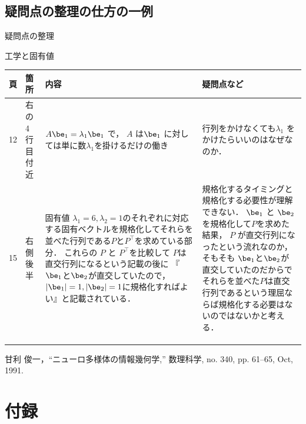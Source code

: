\documentclass[a4paper,11pt,dvipdfmx]{jarticle}  %
\begin{document}
%
%
%
%

\newpage


\subsection{疑問点の整理の仕方の一例}
\centerline{\Large\gt 疑問点の整理}
\vspace{2mm}
\noindent
工学と固有値\\
\begin{center}
\begin{tabular}{|c|p{}|p{}|p{}|} \hline
頁 & 箇所 & 内容 & 疑問点など \\ \hline
12 & 
右の4行目付近
& 
$ A \be_1 = \lambda_1 \be_1 $ で，
$A$ は$\be_1$ に対しては単に数$\lambda_1$を掛けるだけの働き
&
行列をかけなくても$\lambda_1$
をかけたらいいのはなぜなのか．
\\ \hline
%
%
15  &
右側後半
&
固有値 $\lambda_1=6, \lambda_2=1$のそれぞれに対応する固有ベクトルを規格化してそれらを並べた行列である$P$と$P^\top$を求めている部分．
これらの $ P $ と $ P^\top $を比較して
$P$は直交行列になるという記載の後に
『$\be_1$と$\be_2$が直交していたので，$|\be_1 |=1, |\be_2|=1$に規格化すればよい』と記載されている． &
規格化するタイミングと規格化する必要性が理解できない．
$\be_1$ と $\be_2$ を規格化して$P$を求めた結果，
$P$ が直交行列になったという流れなのか，
そもそも $\be_1$と$\be_2$が直交していたのだからでそれらを並べた$P$は直交行列であるという理屈ならば規格化する必要はないのではないかと考える．\\ \hline
& & & \\ \hline
& & & \\ \hline
& & & \\ \hline
\end{tabular}

\end{center}


\lhead{}  %
\rhead{}


\begin{thebibliography}{99}  %

甘利 俊一，``ニューロ多様体の情報幾何学,'' 
数理科学, no. 340, pp. 61--65, Oct, 1991.

\end{thebibliography}



\section*{付録}
\end{document}
